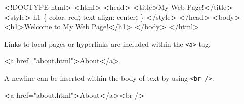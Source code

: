 \documentclass[]{book}
\newenvironment{Shaded}{\begin{snugshade}}{\end{snugshade}}
\newcommand{\KeywordTok}[1]{\textcolor[rgb]{0.13,0.29,0.53}{\textbf{#1}}}
\newcommand{\StringTok}[1]{\textcolor[rgb]{0.31,0.60,0.02}{#1}}
\newcommand{\FunctionTok}[1]{\textcolor[rgb]{0.00,0.00,0.00}{#1}}
\newcommand{\OperatorTok}[1]{\textcolor[rgb]{0.81,0.36,0.00}{\textbf{#1}}}
\newcommand{\ExtensionTok}[1]{#1}
\newcommand{\NormalTok}[1]{#1}
\begin{document}
\begin{Shaded}
\begin{Highlighting}[]
\OperatorTok{<}\NormalTok{!}\ExtensionTok{DOCTYPE}\NormalTok{ html}\OperatorTok{>}         
\OperatorTok{<}\ExtensionTok{html}\OperatorTok{>}                  
    \OperatorTok{<}\FunctionTok{head}\OperatorTok{>}                         
        \OperatorTok{<}\ExtensionTok{title}\OperatorTok{>}\NormalTok{My Web Page!}\OperatorTok{<}\NormalTok{/title}\OperatorTok{>}
        \OperatorTok{<}\ExtensionTok{style}\OperatorTok{>}                    
            \ExtensionTok{h1}\NormalTok{ \{                   }
                \ExtensionTok{color}\NormalTok{: red}\KeywordTok{;}        
                \ExtensionTok{text-align}\NormalTok{: center}\KeywordTok{;}
\NormalTok{            \}                      }
        \OperatorTok{<}\NormalTok{/}\ExtensionTok{style}\OperatorTok{>}                   
    \OperatorTok{<}\NormalTok{/}\ExtensionTok{head}\OperatorTok{>}                        
    \OperatorTok{<}\ExtensionTok{body}\OperatorTok{>}              
        \OperatorTok{<}\ExtensionTok{h1}\OperatorTok{>}\NormalTok{Welcome to My Web Page!}\OperatorTok{<}\NormalTok{/h1}\OperatorTok{>}
    \OperatorTok{<}\NormalTok{/}\ExtensionTok{body}\OperatorTok{>}             
\OperatorTok{<}\NormalTok{/}\ExtensionTok{html}\OperatorTok{>}                 
\end{Highlighting}
\end{Shaded}

Links to local pages or hyperlinks are included within the
\texttt{\textless{}a\textgreater{}} tag.

\begin{Shaded}
\begin{Highlighting}[]
\OperatorTok{<}\ExtensionTok{a}\NormalTok{ href=}\StringTok{"about.html"}\OperatorTok{>}\NormalTok{About}\OperatorTok{<}\NormalTok{/a}\OperatorTok{>}
\end{Highlighting}
\end{Shaded}

A newline can be inserted within the body of text by using
\texttt{\textless{}br\ /\textgreater{}}.

\begin{Shaded}
\begin{Highlighting}[]
\OperatorTok{<}\ExtensionTok{a}\NormalTok{ href=}\StringTok{"about.html"}\OperatorTok{>}\NormalTok{About}\OperatorTok{<}\NormalTok{/a}\OperatorTok{><}\NormalTok{br /}\OperatorTok{>}
\end{Highlighting}
\end{Shaded}
\end{document}
